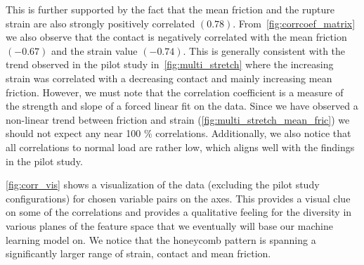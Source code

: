 This is further supported by the fact that the mean friction and the rupture
strain are also strongly positively correlated $(0.78)$. From~\cref{fig:corrcoef_matrix} we also observe that the contact is negatively
correlated with the mean friction $(-0.67)$ and the strain value $(-0.74)$. This is generally consistent with the trend observed in the pilot study in~\cref{fig:multi_stretch} where the increasing strain was correlated with a decreasing contact and mainly increasing mean friction. However, we must note that the correlation coefficient is a measure of the strength and slope of a forced linear fit on the data. Since we have observed a non-linear trend between friction and strain (\cref{fig:multi_stretch_mean_fric}) we should not expect any near 100 \% correlations. Additionally, we also notice that all correlations to normal load are rather low, which aligns well with the findings in the pilot study. 

\cref{fig:corr_vis} shows a visualization of the data (excluding
the pilot study configurations) for chosen variable pairs on the axes. This
provides a visual clue on some of the correlations and provides a qualitative
feeling for the diversity in various planes of the feature space that we
eventually will base our machine learning model on. We notice that the
honeycomb pattern is spanning a significantly larger range of strain, contact
and mean friction.


